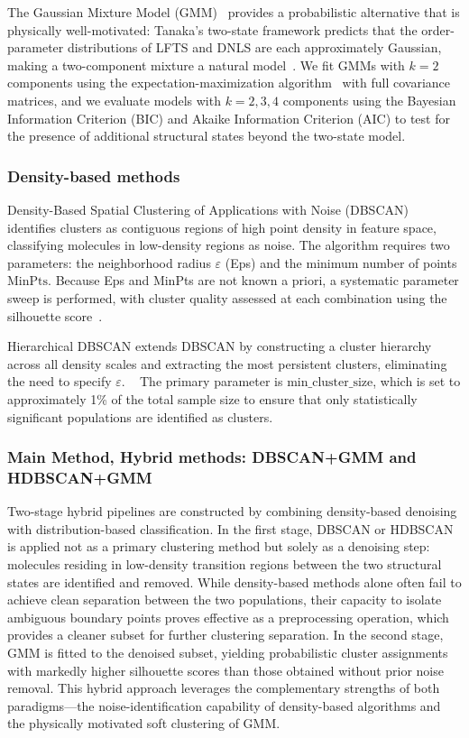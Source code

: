 \documentclass[aps, amsmath,amssymb, reprint, onecolumn,notitlepage,superscriptaddress]{revtex4-2}
\begin{document}
The Gaussian Mixture Model (GMM)~\cite{deprez-2024} provides a probabilistic alternative that is physically well-motivated: Tanaka's two-state framework predicts that the order-parameter distributions of LFTS and DNLS are each approximately Gaussian, making a two-component mixture a natural model~\cite{shi_direct_2020}. We fit GMMs with $k = 2$ components using the expectation-maximization algorithm~\cite{dempster_maximum_1977} with full covariance matrices, and we evaluate models with $k = 2, 3, 4$ components using the Bayesian Information Criterion (BIC) and Akaike Information Criterion (AIC) to test for the presence of additional structural states beyond the two-state model.

\subsubsection{Density-based methods}
Density-Based Spatial Clustering of Applications with Noise (DBSCAN)~\cite{ester_density-based_1996} identifies clusters as contiguous regions of high point density in feature space, classifying molecules in low-density regions as noise. The algorithm requires two parameters: the neighborhood radius $\varepsilon$ (Eps) and the minimum number of points $\mathrm{MinPts}$. Because Eps and MinPts are not known a priori, a systematic parameter sweep is performed, with cluster quality assessed at each combination using the silhouette score~\cite{rousseeuw_silhouettes_1987}.

Hierarchical DBSCAN extends DBSCAN by constructing a cluster hierarchy across all density scales and extracting the most persistent clusters, eliminating the need to specify $\varepsilon$. ~\cite{mcinnes_hdbscan_2017} The primary parameter is $\text{min\_cluster\_size}$, which is set to approximately 1\% of the total sample size to ensure that only statistically significant populations are identified as clusters.

\subsubsection{Main Method, Hybrid methods: DBSCAN+GMM and HDBSCAN+GMM}
Two-stage hybrid pipelines are constructed by combining density-based denoising with distribution-based classification. In the first stage, DBSCAN or HDBSCAN is applied not as a primary clustering method but solely as a denoising step: molecules residing in low-density transition regions between the two structural states are identified and removed. While density-based methods alone often fail to achieve clean separation between the two populations, their capacity to isolate ambiguous boundary points proves effective as a preprocessing operation, which provides a cleaner subset for further clustering separation. In the second stage, GMM is fitted to the denoised subset, yielding probabilistic cluster assignments with markedly higher silhouette scores than those obtained without prior noise removal. This hybrid approach leverages the complementary strengths of both paradigms---the noise-identification capability of density-based algorithms and the physically motivated soft clustering of GMM.
\end{document}
